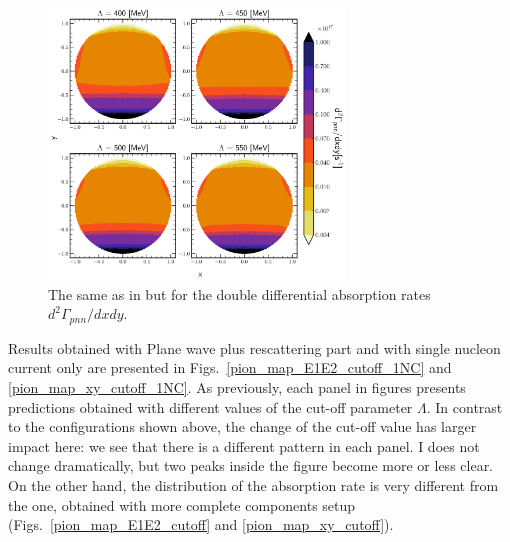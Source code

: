     \begin{figure}[h]
        \begin{center}
        \includegraphics[width=0.7\textwidth]{PlotData/PION/Dalitz_maps/figures/Dalitz_map_pnn_xy_cutofs_PWIAS.pdf}
        \end{center}
        \caption{The same as in  but for the double differential absorption rates
        $d^2 \Gamma_{pnn}/dxdy$.}
        \label{pion_map_xy_cutoff_PW}
    \end{figure}

    Results obtained with Plane wave plus rescattering part and with single nucleon current only
    are presented in Figs.~\ref{pion_map_E1E2_cutoff_1NC} and \ref{pion_map_xy_cutoff_1NC}.
    As previously, each panel in figures presents predictions obtained with different values of the cut-off parameter $\Lambda$.
    In contrast to the configurations shown above, the change of the cut-off value has larger impact here:
    we see that there is a different pattern in each panel. I does not change dramatically, but 
    two peaks inside the figure become more or less clear. On the other hand, the distribution of 
    the absorption rate is very different from the one, obtained with more complete components setup 
    (Figs.~\ref{pion_map_E1E2_cutoff} and \ref{pion_map_xy_cutoff}).

